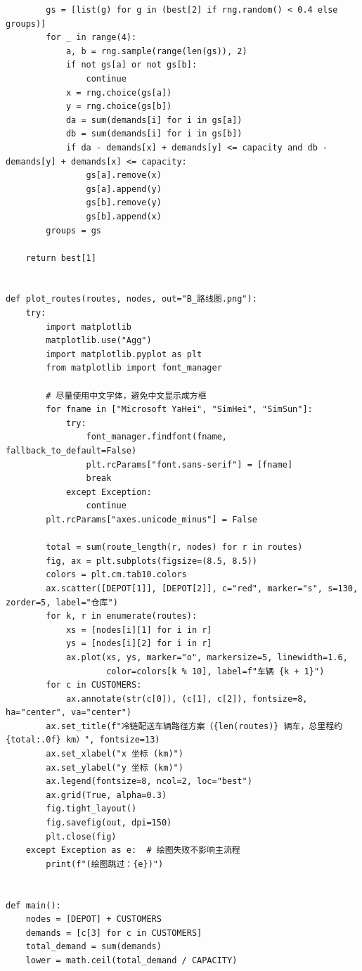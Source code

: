 \documentclass[12pt,a4paper]{ctexart}
\begin{document}
\begin{lstlisting}
        gs = [list(g) for g in (best[2] if rng.random() < 0.4 else groups)]
        for _ in range(4):
            a, b = rng.sample(range(len(gs)), 2)
            if not gs[a] or not gs[b]:
                continue
            x = rng.choice(gs[a])
            y = rng.choice(gs[b])
            da = sum(demands[i] for i in gs[a])
            db = sum(demands[i] for i in gs[b])
            if da - demands[x] + demands[y] <= capacity and db - demands[y] + demands[x] <= capacity:
                gs[a].remove(x)
                gs[a].append(y)
                gs[b].remove(y)
                gs[b].append(x)
        groups = gs

    return best[1]


def plot_routes(routes, nodes, out="B_路线图.png"):
    try:
        import matplotlib
        matplotlib.use("Agg")
        import matplotlib.pyplot as plt
        from matplotlib import font_manager

        # 尽量使用中文字体，避免中文显示成方框
        for fname in ["Microsoft YaHei", "SimHei", "SimSun"]:
            try:
                font_manager.findfont(fname, fallback_to_default=False)
                plt.rcParams["font.sans-serif"] = [fname]
                break
            except Exception:
                continue
        plt.rcParams["axes.unicode_minus"] = False

        total = sum(route_length(r, nodes) for r in routes)
        fig, ax = plt.subplots(figsize=(8.5, 8.5))
        colors = plt.cm.tab10.colors
        ax.scatter([DEPOT[1]], [DEPOT[2]], c="red", marker="s", s=130, zorder=5, label="仓库")
        for k, r in enumerate(routes):
            xs = [nodes[i][1] for i in r]
            ys = [nodes[i][2] for i in r]
            ax.plot(xs, ys, marker="o", markersize=5, linewidth=1.6,
                    color=colors[k % 10], label=f"车辆 {k + 1}")
        for c in CUSTOMERS:
            ax.annotate(str(c[0]), (c[1], c[2]), fontsize=8, ha="center", va="center")
        ax.set_title(f"冷链配送车辆路径方案（{len(routes)} 辆车，总里程约 {total:.0f} km）", fontsize=13)
        ax.set_xlabel("x 坐标 (km)")
        ax.set_ylabel("y 坐标 (km)")
        ax.legend(fontsize=8, ncol=2, loc="best")
        ax.grid(True, alpha=0.3)
        fig.tight_layout()
        fig.savefig(out, dpi=150)
        plt.close(fig)
    except Exception as e:  # 绘图失败不影响主流程
        print(f"(绘图跳过：{e})")


def main():
    nodes = [DEPOT] + CUSTOMERS
    demands = [c[3] for c in CUSTOMERS]
    total_demand = sum(demands)
    lower = math.ceil(total_demand / CAPACITY)


\end{lstlisting}
\end{document}
